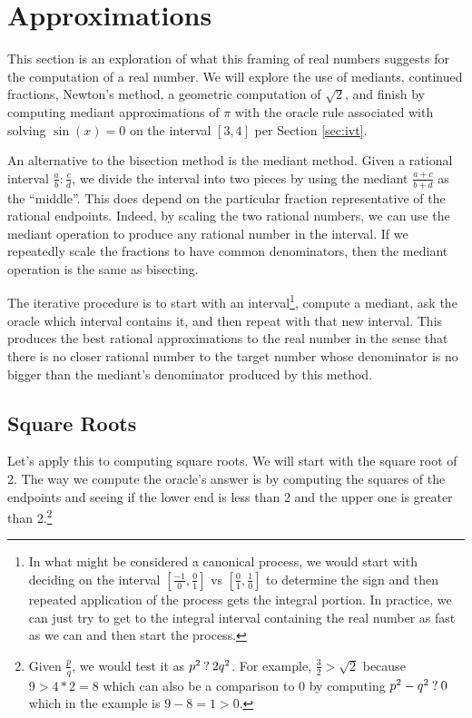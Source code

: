 \documentclass[12pt]{article}
\begin{document}
\section{Approximations}\label{sec:mediant}

This section is an exploration of what this framing of real numbers suggests for the computation of a real number. We will explore the use of mediants, continued fractions, Newton's method, a geometric computation of $\sqrt{2}$, and finish by computing mediant approximations of $\pi$ with the oracle  rule associated with solving $\sin(x)=0$ on the interval $[3,4]$ per Section \ref{sec:ivt}.

An alternative to the bisection method is the mediant method. Given a rational interval $\frac{a}{b} : \frac{c}{d}$, we divide the interval into two pieces by using the mediant $\frac{a+c}{b+d}$ as the ``middle''. This does depend on the particular fraction representative of the rational endpoints. Indeed, by scaling the two rational numbers, we can use the mediant operation to produce any rational number in the interval. If we repeatedly scale the fractions to have common denominators, then the mediant operation is the same as bisecting. 

The iterative procedure is to start with an interval\footnote{In what might be considered a canonical process, we would start with deciding on the interval $[\frac{-1}{0}, \frac{0}{1}]$ vs $[\frac{0}{1}, \frac{1}{0}]$ to determine the sign and then repeated application of the process gets the integral portion. In practice, we can just try to get to the integral interval containing the real number as fast as we can and then start the process.}, compute a mediant, ask the oracle which interval contains it, and then repeat with that new interval. This produces the best rational approximations to the real number in the sense that there is no closer rational number to the target number whose denominator is no bigger than the mediant's denominator produced by this method. 


\subsection{Square Roots}

Let's apply this to computing square roots. We will start with the square root of 2. The way we compute the oracle's answer is by computing the squares of the endpoints and seeing if the lower end is less than 2 and the upper one is greater than 2.\footnote{Given $\frac{p}{q}$, we would test it as $p^2 \mathbin{?} 2q^2$. For example, $\frac{3}{2} > \sqrt{2}$ because $9 > 4*2 = 8$ which can also be a comparison to 0 by computing $p^2 - q^2 \mathbin{?} 0$ which in the example is $9-8=1 > 0$.}
\end{document}
